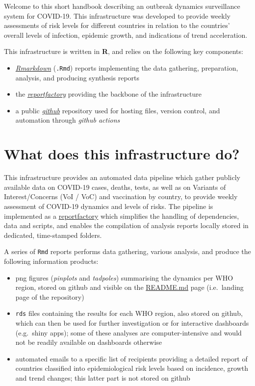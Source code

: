 \documentclass[]{book}
\begin{document}
Welcome to this short handbook describing an outbreak dynamics surveillance
system for COVID-19. This infrastructure was developed to provide weekly
assessments of risk levels for different countries in relation to the countries'
overall levels of infection, epidemic growth, and indications of trend
acceleration.

This infrastructure is written in \textbf{R}, and relies on the following key
components:

\begin{itemize}
\item
  \href{https://rmarkdown.rstudio.com/}{\emph{Rmarkdown}} (\texttt{.Rmd}) reports implementing
  the data gathering, preparation, analysis, and producing synthesis reports
\item
  the \href{https://www.reconverse.org/reportfactory/}{\emph{reportfactory}} providing the
  backbone of the infrastructure
\item
  a public \href{https://github.com/whocov/trend_analysis_public}{\emph{github}}
  repository used for hosting files, version control, and automation through
  \emph{github actions}
\end{itemize}

\hypertarget{what-does-this-infrastructure-do}{%
\section{What does this infrastructure do?}\label{what-does-this-infrastructure-do}}

This infrastructure provides an automated data pipeline which gather publicly
available data on COVID-19 cases, deaths, tests, as well as on Variants of
Interest/Concerns (VoI / VoC) and vaccination by country, to provide weekly
assessment of COVID-19 dynamics and levels of risks. The pipeline is implemented
as a \href{https://www.reconverse.org/reportfactory/}{reportfactory} which simplifies
the handling of dependencies, data and scripts, and enables the compilation of
analysis reports locally stored in dedicated, time-stamped folders.

A series of \texttt{Rmd} reports performs data gathering, various analysis, and produce
the following information products:

\begin{itemize}
\item
  png figures (\emph{pinplots} and \emph{tadpoles}) summarising the dynamics per WHO
  region, stored on github and visible on the
  \href{https://github.com/whocov/trend_analysis_public}{README.md} page (i.e.~landing
  page of the repository)
\item
  \texttt{rds} files containing the results for each WHO region, also stored on github,
  which can then be used for further investigation or for interactive dashboards
  (e.g.~shiny apps); some of these analyses are computer-intensive and would not
  be readily available on dashboards otherwise
\item
  automated emails to a specific list of recipients providing a detailed report
  of countries classified into epidemiological risk levels based on incidence,
  growth and trend changes; this latter part is not stored on github
\end{itemize}
\end{document}
